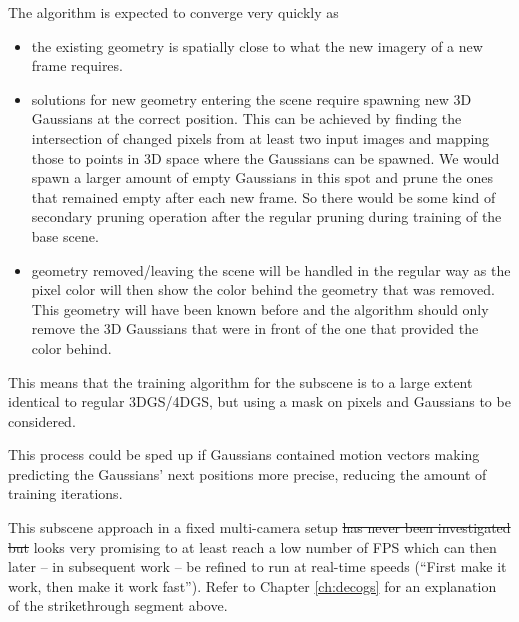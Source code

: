 The algorithm is expected to converge very quickly as
\begin{itemize}
	\item the existing geometry is spatially close to what the new imagery of a new frame requires.
	\item solutions for new geometry entering the scene require spawning new 3D Gaussians at the correct position. This can be achieved by finding the intersection of changed pixels from at least two input images and mapping those to points in 3D space where the Gaussians can be spawned. We would spawn a larger amount of empty Gaussians in this spot and prune the ones that remained empty after each new frame. So there would be some kind of secondary pruning operation after the regular pruning during training of the base scene.
	\item geometry removed/leaving the scene will be handled in the regular way as the pixel color will then show the color behind the geometry that was removed. This geometry will have been known before and the algorithm should only remove the 3D Gaussians that were in front of the one that provided the color behind.
\end{itemize}
This means that the training algorithm for the subscene is to a large extent identical to regular 3DGS/4DGS, but using a mask on pixels and Gaussians to be considered.

This process could be sped up if Gaussians contained motion vectors making predicting the Gaussians' next positions more precise, reducing the amount of training iterations.

This subscene approach in a fixed multi-camera setup \st{has never been investigated but} looks very promising to at least reach a low number of FPS which can then later -- in subsequent work -- be refined to run at real-time speeds (\enquote{First make it work, then make it work fast}). Refer to Chapter \ref{ch:decogs} for an explanation of the strikethrough segment above.

